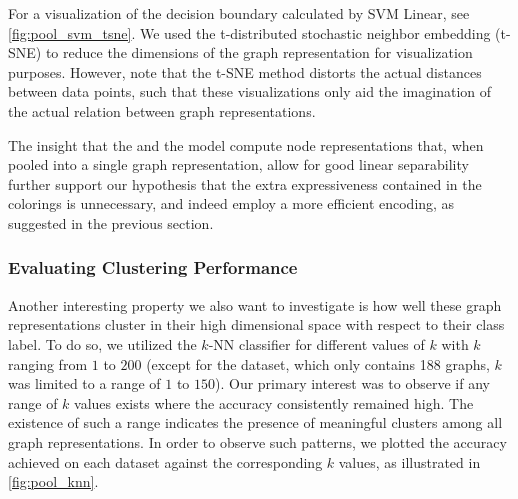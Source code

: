 For a visualization of the decision boundary calculated by \textsf{SVM Linear}, see \cref{fig:pool_svm_tsne}. We used the \textsf{t-distributed stochastic neighbor embedding (t-SNE)} to reduce the dimensions of the graph representation for visualization purposes. However, note that the \textsf{t-SNE} method distorts the actual distances between data points, such that these visualizations only aid the imagination of the actual relation between graph representations. 

The insight that the \gnn and the \wlnn model compute node representations that, when pooled into a single graph representation, allow for good linear separability further support our hypothesis that the extra expressiveness contained in the \wl colorings is unnecessary, and \gnns indeed employ a more efficient encoding, as suggested in the previous section.

\subsubsection{Evaluating Clustering Performance}
Another interesting property we also want to investigate is how well these graph representations cluster in their high dimensional space with respect to their class label. To do so, we utilized the \textsf{$k$-NN} classifier for different values of $k$ with $k$ ranging from $1$ to $200$ (except for the \mutag dataset, which only contains 188 graphs, $k$ was limited to a range of $1$ to $150$). Our primary interest was to observe if any range of $k$ values exists where the accuracy consistently remained high. The existence of such a range indicates the presence of meaningful clusters among all graph representations. In order to observe such patterns, we plotted the accuracy achieved on each dataset against the corresponding $k$ values, as illustrated in \cref{fig:pool_knn}.


